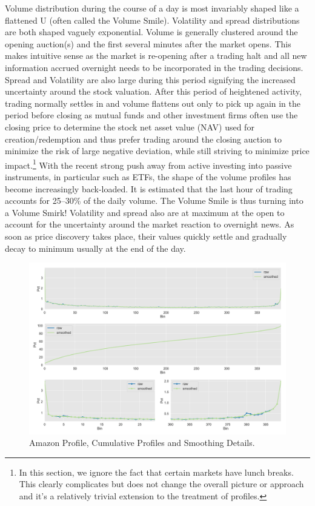 Volume distribution during the course of a day is most invariably shaped like a flattened U (often called the Volume Smile). Volatility and spread distributions are both shaped vaguely exponential. Volume is generally clustered around the opening auction(s) and the first several minutes after the market opens. This makes intuitive sense as the market is re-opening after a trading halt and all new information accrued overnight needs to be incorporated in the trading decisions. Spread and Volatility are also large during this period signifying the increased uncertainty around the stock valuation. After this period of heightened activity,  trading normally settles in and volume flattens out only to pick up again in the period before closing as mutual funds and other investment firms often use the closing price to determine the stock net asset value (NAV) used for creation/redemption and thus prefer trading around the closing auction to minimize the risk of large negative deviation, while still striving to minimize price impact.\footnote{In this section, we ignore the fact that certain markets have lunch breaks. This clearly complicates but does not change the overall picture or approach and it's a relatively trivial extension to the treatment of profiles.} With the recent strong push away from active investing into passive instruments, in particular such as ETFs, the shape of the volume profiles has become increasingly back-loaded. It is estimated that the last hour of trading accounts for 25--30\% of the daily volume. The Volume Smile is thus turning into a Volume Smirk! Volatility and spread also are at maximum at the open to account for the uncertainty around the market reaction to  overnight news. As soon as price discovery takes place, their values quickly settle and gradually decay to minimum usually at the end of the day. \twomedskip

	\begin{figure}[!ht]
	\centering
	\includegraphics[width=\textwidth]{chapters/chapter_trade_data_models/figures/amzn_profile.png} 
	\caption{Amazon Profile, Cumulative Profiles and Smoothing Details.\label{fig:amazon_prof}}
	\end{figure}

